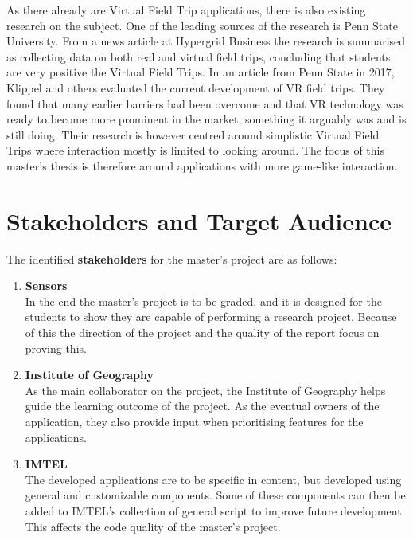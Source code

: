     As there already are Virtual Field Trip applications, there is also existing research on the subject. One of the leading sources of the research is Penn State University. From a news article at Hypergrid Business\cite{hypergrid} the research is summarised as collecting data on both real and virtual field trips, concluding that students are very positive the Virtual Field Trips. In an article from Penn State in 2017, Klippel and others\cite{developing_and_evaluating} evaluated the current development of VR field trips. They found that many earlier barriers had been overcome and that VR technology was ready to become more prominent in the market, something it arguably was and is still doing. Their research is however centred around simplistic Virtual Field Trips where interaction mostly is limited to looking around. The focus of this master's thesis is therefore around applications with more game-like interaction.
    
\section{Stakeholders and Target Audience}
    The identified \textbf{stakeholders} for the master's project are as follows:
    
    
    \begin{enumerate}
        \item \textbf{Sensors} \\
        In the end the master's project is to be graded, and it is designed for the students to show they are capable of performing a research project. Because of this the direction of the project and the quality of the report focus on proving this.
        
        \SPACE
        
        \item \textbf{Institute of Geography} \\
        As the main collaborator on the project, the Institute of Geography helps guide the learning outcome of the project. As the eventual owners of the application, they also provide input when prioritising features for the applications.
        
        \SPACE
        
        \item \textbf{IMTEL} \\
        The developed applications are to be specific in content, but developed using general and customizable components. Some of these components can then be added to IMTEL's collection of general script to improve future development. This affects the code quality of the master's project.
    \end{enumerate}
    
